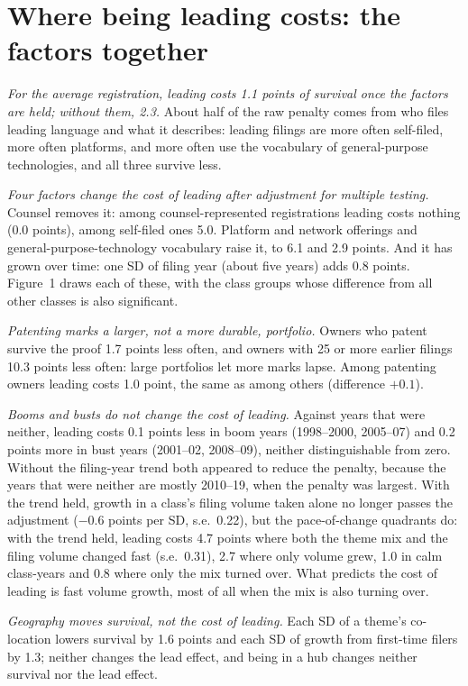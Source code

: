 \section*{Where being leading costs: the factors together}

\emph{For the average registration, leading costs 1.1 points of
survival once the factors are held; without them, 2.3.} About half of
the raw penalty comes from who files leading language and what it
describes: leading filings are more often self-filed, more often
platforms, and more often use the vocabulary of general-purpose
technologies, and all three survive less.

\emph{Four factors change the cost of leading after adjustment for
multiple testing.} Counsel removes it: among counsel-represented
registrations leading costs nothing (0.0 points), among self-filed ones
5.0. Platform and network offerings and general-purpose-technology
vocabulary raise it, to 6.1 and 2.9 points. And it has grown over time:
one SD of filing year (about five years) adds 0.8 points. Figure~1 draws
each of these, with the class groups whose difference from all other
classes is also significant.

\emph{Patenting marks a larger, not a more durable, portfolio.} Owners
who patent survive the proof 1.7 points less often, and owners with 25
or more earlier filings 10.3 points less often: large portfolios let
more marks lapse. Among patenting owners leading costs 1.0 point, the
same as among others (difference $+0.1$).

\emph{Booms and busts do not change the cost of leading.} Against years
that were neither, leading costs 0.1 points less in boom years
(1998--2000, 2005--07) and 0.2 points more in bust years (2001--02,
2008--09), neither distinguishable from zero. Without the filing-year
trend both appeared to reduce the penalty, because the years that were
neither are mostly 2010--19, when the penalty was largest. With the
trend held, growth in a class's filing volume taken alone no longer
passes the adjustment ($-0.6$ points per SD, s.e.\ 0.22), but the
pace-of-change quadrants do: with the trend held, leading costs 4.7
points where both the theme mix and the filing volume changed fast
(s.e.\ 0.31), 2.7 where only volume grew, 1.0 in calm class-years and
0.8 where only the mix turned over. What predicts the cost of leading is
fast volume growth, most of all when the mix is also turning over.

\emph{Geography moves survival, not the cost of leading.} Each SD of a
theme's co-location lowers survival by 1.6 points and each SD of growth
from first-time filers by 1.3; neither changes the lead effect, and being
in a hub changes neither survival nor the lead effect.

